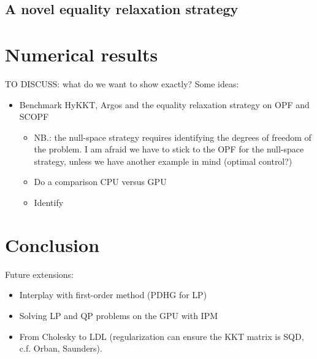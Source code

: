 \documentclass{article}
\theoremstyle{definition}
\theoremstyle{remark}
\begin{document}
\subsection{A novel equality relaxation strategy}



\section{Numerical results}
TO DISCUSS: what do we want to show exactly? Some ideas:
\begin{itemize}
  \item Benchmark HyKKT, Argos and the equality relaxation strategy
    on OPF and SCOPF
    \begin{itemize}
      \item NB.: the null-space strategy requires identifying
        the degrees of freedom of the problem. I am afraid
        we have to stick to the OPF for the null-space strategy,
        unless we have another example in mind (optimal control?)
      \item Do a comparison CPU versus GPU
      \item Identify
    \end{itemize}
\end{itemize}

\section{Conclusion}
Future extensions:
\begin{itemize}
  \item Interplay with first-order method (PDHG for LP)
  \item Solving LP and QP problems on the GPU with IPM
  \item From Cholesky to LDL (regularization can
    ensure the KKT matrix is SQD, c.f. Orban, Saunders).
\end{itemize}



\end{document}
